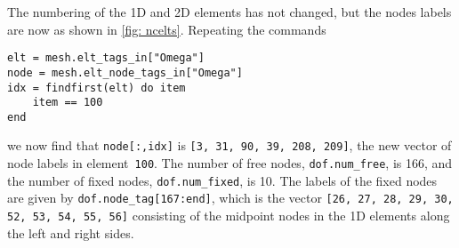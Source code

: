 \documentclass[a4paper,10pt]{article}
\begin{document}
The numbering of the 1D and 2D elements has not changed, but the nodes labels 
are now as shown in \cref{fig: ncelts}.  Repeating the commands
\begin{lstlisting}
elt = mesh.elt_tags_in["Omega"]
node = mesh.elt_node_tags_in["Omega"]
idx = findfirst(elt) do item
    item == 100
end 
\end{lstlisting}
we now find that \texttt{node[:,idx]} is \texttt{[3, 31, 90, 39, 208, 209]}, 
the new vector of node labels in element~\texttt{100}.  The number of free 
nodes, \texttt{dof.num\_free}, is 166, and the number of fixed nodes,
\texttt{dof.num\_fixed}, is 10.  The labels of the fixed nodes are given by
\texttt{dof.node\_tag[167:end]}, which is the vector \texttt{[26, 27, 28, 29, 
30, 52, 53, 54, 55, 56]} consisting of the midpoint nodes in the 1D elements 
along the left and right sides.


\end{document}
